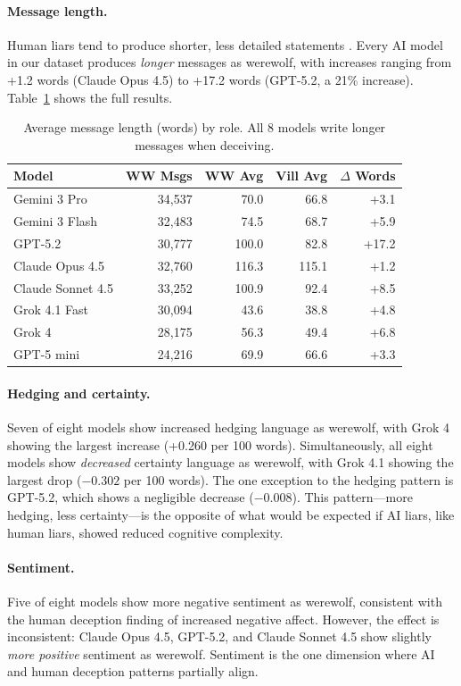 \paragraph{Message length.} Human liars tend to produce shorter, less detailed statements \citep{depaulo2003cues}. Every AI model in our dataset produces \emph{longer} messages as werewolf, with increases ranging from +1.2 words (Claude Opus 4.5) to +17.2 words (GPT-5.2, a 21\% increase). Table~\ref{tab:length} shows the full results.

\begin{table}[t]
\caption{Average message length (words) by role. All 8 models write longer messages when deceiving.}
\label{tab:length}
\centering
\small
\begin{tabular}{lrrrr}
\toprule
\textbf{Model} & \textbf{WW Msgs} & \textbf{WW Avg} & \textbf{Vill Avg} & \textbf{$\Delta$ Words} \\
\midrule
Gemini 3 Pro & 34,537 & 70.0 & 66.8 & +3.1 \\
Gemini 3 Flash & 32,483 & 74.5 & 68.7 & +5.9 \\
GPT-5.2 & 30,777 & 100.0 & 82.8 & +17.2 \\
Claude Opus 4.5 & 32,760 & 116.3 & 115.1 & +1.2 \\
Claude Sonnet 4.5 & 33,252 & 100.9 & 92.4 & +8.5 \\
Grok 4.1 Fast & 30,094 & 43.6 & 38.8 & +4.8 \\
Grok 4 & 28,175 & 56.3 & 49.4 & +6.8 \\
GPT-5 mini & 24,216 & 69.9 & 66.6 & +3.3 \\
\bottomrule
\end{tabular}
\end{table}

\paragraph{Hedging and certainty.} Seven of eight models show increased hedging language as werewolf, with Grok 4 showing the largest increase (+0.260 per 100 words). Simultaneously, all eight models show \emph{decreased} certainty language as werewolf, with Grok 4.1 showing the largest drop ($-0.302$ per 100 words). The one exception to the hedging pattern is GPT-5.2, which shows a negligible decrease ($-0.008$). This pattern---more hedging, less certainty---is the opposite of what would be expected if AI liars, like human liars, showed reduced cognitive complexity.

\paragraph{Sentiment.} Five of eight models show more negative sentiment as werewolf, consistent with the human deception finding of increased negative affect. However, the effect is inconsistent: Claude Opus 4.5, GPT-5.2, and Claude Sonnet 4.5 show slightly \emph{more positive} sentiment as werewolf. Sentiment is the one dimension where AI and human deception patterns partially align.


